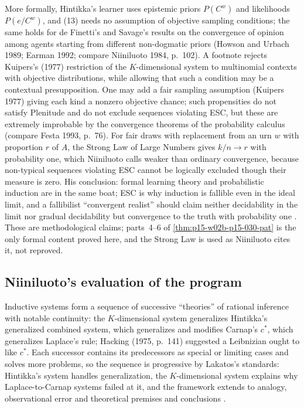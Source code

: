 More formally, Hintikka's learner uses epistemic priors \(P(C^w)\) and
likelihoods \(P(e/C^w)\), and (13) needs no assumption of objective sampling
conditions; the same holds for de Finetti's and Savage's results on the
convergence of opinion among agents starting from different
non-dogmatic priors (Howson and Urbach 1989; Earman 1992; compare
Niiniluoto 1984, p.~102). A footnote rejects Kuipers's (1977) restriction of the
\(K\)-dimensional system to multinomial contexts with objective
distributions, while allowing that such a condition may be a contextual
presupposition. One may add a fair sampling assumption (Kuipers 1977)
giving each kind a nonzero objective chance; such propensities do not
satisfy Plenitude and do not exclude sequences violating ESC, but these are
extremely improbable by the convergence theorems of the probability
calculus (compare Festa 1993, p.~76). For fair draws with
replacement from an urn \(w\) with proportion \(r\) of \(A\), the Strong Law of
Large Numbers gives \(k/n\to r\) with probability one, which Niiniluoto calls
weaker than ordinary convergence, because non-typical sequences violating
ESC cannot be logically excluded though their measure is zero. His
conclusion: formal learning theory and probabilistic induction are in the
same boat; ESC is why induction is fallible even in the ideal limit, and a
fallibilist ``convergent realist'' should claim neither decidability in the
limit nor gradual decidability but convergence to the truth with
probability one \cite[p.~348 and n.~11]{Niiniluoto2011HintikkaProgramReading}.
These are methodological claims; parts~4--6 of
\cref{thm:p15-w02b-p15-030-pat} is the only formal content proved here,
and the Strong Law is used as Niiniluoto cites it, not reproved.

\subsection{Niiniluoto's evaluation of the program}
\label{sec:p15-w02b-p15-030-nn-evaluation}

Inductive systems form a sequence of successive ``theories'' of rational
inference with notable continuity: the \(K\)-dimensional system generalizes
Hintikka's generalized combined system, which generalizes and modifies
Carnap's \(c^*\), which generalizes Laplace's rule; Hacking (1975, p.~141)
suggested a Leibnizian ought to like \(c^*\). Each successor contains its
predecessors as special or limiting cases and solves more problems, so the
sequence is progressive by Lakatos's standards: Hintikka's system handles
generalization, the \(K\)-dimensional system explains why Laplace-to-Carnap
systems failed at it, and the framework extends to analogy, observational
error and theoretical premises and conclusions
\cite[p.~349]{Niiniluoto2011HintikkaProgramReading}.

